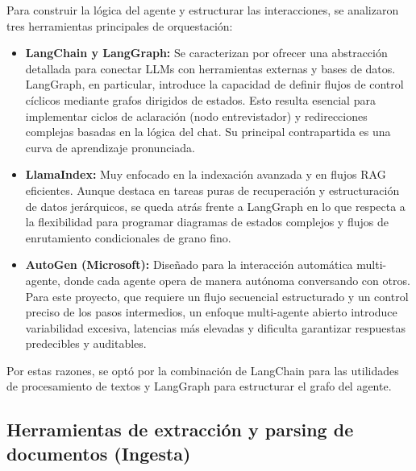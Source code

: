 \documentclass[12pt,a4paper,oneside]{report}
\begin{document}
Para construir la lógica del agente y estructurar las interacciones, se analizaron tres herramientas principales de orquestación:
\begin{itemize}
    \item \textbf{LangChain y LangGraph:} Se caracterizan por ofrecer una abstracción detallada para conectar LLMs con herramientas externas y bases de datos. LangGraph, en particular, introduce la capacidad de definir flujos de control cíclicos mediante grafos dirigidos de estados. Esto resulta esencial para implementar ciclos de aclaración (nodo entrevistador) y redirecciones complejas basadas en la lógica del chat. Su principal contrapartida es una curva de aprendizaje pronunciada.
    \item \textbf{LlamaIndex:} Muy enfocado en la indexación avanzada y en flujos RAG eficientes. Aunque destaca en tareas puras de recuperación y estructuración de datos jerárquicos, se queda atrás frente a LangGraph en lo que respecta a la flexibilidad para programar diagramas de estados complejos y flujos de enrutamiento condicionales de grano fino.
    \item \textbf{AutoGen (Microsoft):} Diseñado para la interacción automática multi-agente, donde cada agente opera de manera autónoma conversando con otros. Para este proyecto, que requiere un flujo secuencial estructurado y un control preciso de los pasos intermedios, un enfoque multi-agente abierto introduce variabilidad excesiva, latencias más elevadas y dificulta garantizar respuestas predecibles y auditables.
\end{itemize}

Por estas razones, se optó por la combinación de LangChain para las utilidades de procesamiento de textos y LangGraph para estructurar el grafo del agente.

\subsection*{Herramientas de extracción y parsing de documentos (Ingesta)}
\end{document}
